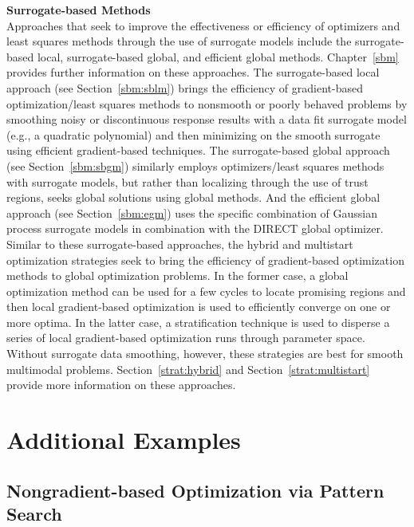 {\bf Surrogate-based Methods} \\
Approaches that seek to improve the effectiveness or efficiency of
optimizers and least squares methods through the use of surrogate
models include the surrogate-based local, surrogate-based global, and
efficient global methods.  Chapter~\ref{sbm} provides further
information on these approaches.  The surrogate-based local approach
(see Section~\ref{sbm:sblm}) brings the efficiency of gradient-based
optimization/least squares methods to nonsmooth or poorly behaved
problems by smoothing noisy or discontinuous response results with a
data fit surrogate model (e.g., a quadratic polynomial) and then
minimizing on the smooth surrogate using efficient gradient-based
techniques.  The surrogate-based global approach (see
Section~\ref{sbm:sbgm}) similarly employs optimizers/least squares
methods with surrogate models, but rather than localizing through the
use of trust regions, seeks global solutions using global methods.
And the efficient global approach (see Section~\ref{sbm:egm}) uses the
specific combination of Gaussian process surrogate models in
combination with the DIRECT global optimizer.  Similar to these
surrogate-based approaches, the hybrid and multistart optimization
strategies seek to bring the efficiency of gradient-based optimization
methods to global optimization problems.  In the former case, a global
optimization method can be used for a few cycles to locate promising
regions and then local gradient-based optimization is used to
efficiently converge on one or more optima. In the latter case, a
stratification technique is used to disperse a series of local
gradient-based optimization runs through parameter space.  Without
surrogate data smoothing, however, these strategies are best for
smooth multimodal problems. Section~\ref{strat:hybrid} and
Section~\ref{strat:multistart} provide more information on these
approaches.

\section{Additional Examples}\label{opt:examples}

\subsection{Nongradient-based Optimization via Pattern Search}\label{opt:examples:ps}


